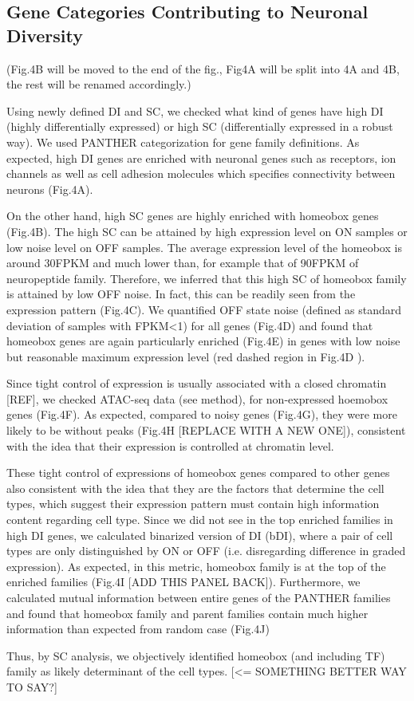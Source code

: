 \subsection{Gene Categories Contributing to Neuronal Diversity}

(Fig.4B will be moved to the end of the fig., Fig4A will be split into 4A and 4B, the rest will be renamed accordingly.)

Using newly defined DI and SC, we checked what kind of genes have high DI (highly differentially expressed) or high SC (differentially expressed in a robust way). We used PANTHER categorization for gene family definitions. As expected, high DI genes are enriched with neuronal genes such as receptors, ion channels as well as cell adhesion molecules which specifies connectivity between neurons (Fig.4A). 

On the other hand, high SC genes are highly enriched with homeobox genes (Fig.4B). The high SC can be attained by high expression level on ON samples or low noise level on OFF samples. The average expression level of the homeobox is around 30FPKM and much lower than, for example that of 90FPKM of neuropeptide family. Therefore, we inferred that this high SC of homeobox family is attained by low OFF noise. In fact, this can be readily seen from the expression pattern (Fig.4C). We quantified OFF state noise (defined as standard deviation of samples with FPKM<1) for all genes (Fig.4D) and found that homeobox genes are again particularly enriched (Fig.4E) in genes with low noise but reasonable maximum expression level (red dashed region in Fig.4D ). 

Since tight control of expression is usually associated with a closed chromatin [REF], we checked ATAC-seq data (see method), for non-expressed hoemobox genes (Fig.4F). As expected, compared to noisy genes (Fig.4G), they were more likely to be without peaks (Fig.4H [REPLACE WITH A NEW ONE]), consistent with the idea that their expression is controlled at chromatin level. 

These tight control of expressions of homeobox genes compared to other genes also consistent with the idea that they are the factors that determine the cell types, which suggest their expression pattern must contain high information content regarding cell type. Since we did not see in the top enriched families in high DI genes, we calculated binarized version of DI (bDI), where a pair of cell types are only distinguished by ON or OFF (i.e. disregarding difference in graded expression). As expected, in this metric, homeobox family is at the top of the enriched families (Fig.4I [ADD THIS PANEL BACK]). Furthermore, we calculated mutual information between entire genes of the PANTHER families and found that homeobox family and parent families contain much higher information than expected from random case (Fig.4J)

Thus, by SC analysis, we objectively identified homeobox (and including TF) family as likely determinant of the cell types.  [<= SOMETHING BETTER WAY TO SAY?]



